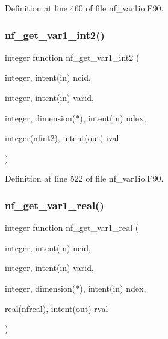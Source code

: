 Definition at line 460 of file nf\+\_\+var1io.\+F90.

\mbox{\label{nf__var1io_8F90_acfa166871d98cc290adbac15bf423f97}} 
\subsubsection{\texorpdfstring{nf\+\_\+get\+\_\+var1\+\_\+int2()}{nf\_get\_var1\_int2()}}
{\footnotesize\ttfamily integer function nf\+\_\+get\+\_\+var1\+\_\+int2 (\begin{DoxyParamCaption}\item[{integer, intent(in)}]{ncid,  }\item[{integer, intent(in)}]{varid,  }\item[{integer, dimension($\ast$), intent(in)}]{ndex,  }\item[{integer(nfint2), intent(out)}]{ival }\end{DoxyParamCaption})}



Definition at line 522 of file nf\+\_\+var1io.\+F90.

\mbox{\label{nf__var1io_8F90_a11ea86469a0286640b081b250dba66e4}} 
\subsubsection{\texorpdfstring{nf\+\_\+get\+\_\+var1\+\_\+real()}{nf\_get\_var1\_real()}}
{\footnotesize\ttfamily integer function nf\+\_\+get\+\_\+var1\+\_\+real (\begin{DoxyParamCaption}\item[{integer, intent(in)}]{ncid,  }\item[{integer, intent(in)}]{varid,  }\item[{integer, dimension($\ast$), intent(in)}]{ndex,  }\item[{real(nfreal), intent(out)}]{rval }\end{DoxyParamCaption})}



